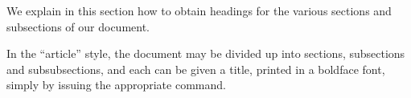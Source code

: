 \documentclass{article}
\begin{document}
We explain in this section how to obtain headings
for the various sections and subsections of our
document.

In the ``article'' style, the document may be divided up
into sections, subsections and subsubsections, and each
can be given a title, printed in a boldface font,
simply by issuing the appropriate command.
\end{document}
